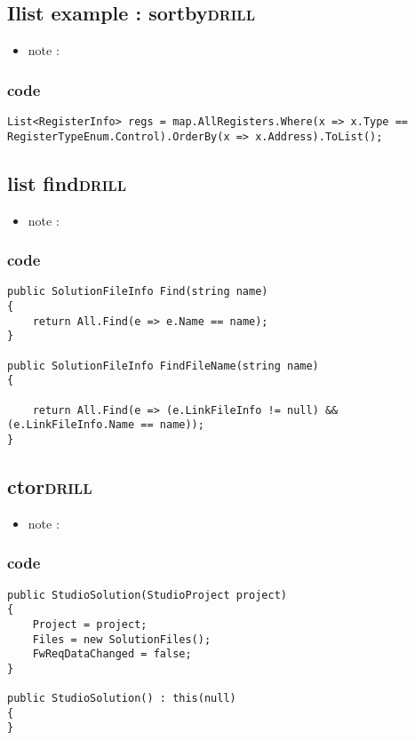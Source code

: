 \documentclass[11pt]{article}
\begin{document}
\subsection{Ilist example : sortby\hfill{}\textsc{drill}}
\label{sec:orgfb1676b}
\begin{itemize}
\item note :
\end{itemize}
\subsubsection{code}
\label{sec:org794a83a}
\begin{verbatim}
List<RegisterInfo> regs = map.AllRegisters.Where(x => x.Type == RegisterTypeEnum.Control).OrderBy(x => x.Address).ToList();

\end{verbatim}

\subsection{list find\hfill{}\textsc{drill}}
\label{sec:orgf965b92}
\begin{itemize}
\item note :
\end{itemize}
\subsubsection{code}
\label{sec:org008d263}
\begin{verbatim}
public SolutionFileInfo Find(string name)
{
    return All.Find(e => e.Name == name);
}

public SolutionFileInfo FindFileName(string name)
{

    return All.Find(e => (e.LinkFileInfo != null) && (e.LinkFileInfo.Name == name));
}

\end{verbatim}

\subsection{ctor\hfill{}\textsc{drill}}
\label{sec:org9ef499f}
\begin{itemize}
\item note :
\end{itemize}
\subsubsection{code}
\label{sec:orga6dc128}
\begin{verbatim}
public StudioSolution(StudioProject project)
{
    Project = project;
    Files = new SolutionFiles();
    FwReqDataChanged = false;
}

public StudioSolution() : this(null)
{
}

\end{verbatim}
\end{document}
